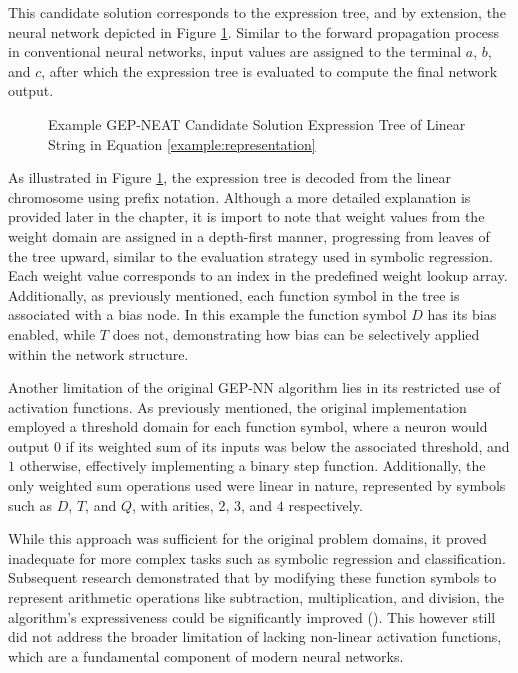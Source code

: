 \parbreak\noindent This candidate solution corresponds to the expression tree, and by extension, the neural network depicted in Figure \ref{fig:gep_neat_representation_example_tree}. Similar to the forward propagation process in conventional neural networks, input values are assigned to the terminal $a$, $b$, and $c$, after which the expression tree is evaluated to compute the final network output.

\parbreak
\begin{figure}[H] %
	\centering %
	\caption{Example GEP-NEAT Candidate Solution Expression Tree of Linear String in Equation \ref{example:representation}}
	\label{fig:gep_neat_representation_example_tree} %
\end{figure}

\parbreak\noindent As illustrated in Figure \ref{fig:gep_neat_representation_example_tree}, the expression tree is decoded from the linear chromosome using prefix notation. Although a more detailed explanation is provided later in the chapter, it is import to note that weight values from the weight domain are assigned in a depth-first manner, progressing from leaves of the tree upward, similar to the evaluation strategy used in symbolic regression. Each weight value corresponds to an index in the predefined weight lookup array. Additionally, as previously mentioned, each function symbol in the tree is associated with a bias node. In this example the function symbol $D$ has its bias enabled, while $T$ does not, demonstrating how bias can be selectively applied within the network structure.

\parbreak\noindent Another limitation of the original GEP-NN algorithm lies in its restricted use of activation functions. As previously mentioned, the original implementation employed a threshold domain for each function symbol, where a neuron would output $0$ if its weighted sum of its inputs was below the associated threshold, and $1$ otherwise, effectively implementing a binary step function. Additionally, the only weighted sum operations used were linear in nature, represented by symbols such as $D$, $T$, and $Q$, with arities, $2$, $3$, and $4$ respectively.

\parbreak\noindent While this approach was sufficient for the original problem domains, it proved inadequate for more complex tasks such as symbolic regression and classification. Subsequent research demonstrated that by modifying these function symbols to represent arithmetic operations like subtraction, multiplication, and division, the algorithm's expressiveness could be significantly improved (\cite{improvedGepnn}). This however still did not address the broader limitation of lacking non-linear activation functions, which are a fundamental component of modern neural networks.

